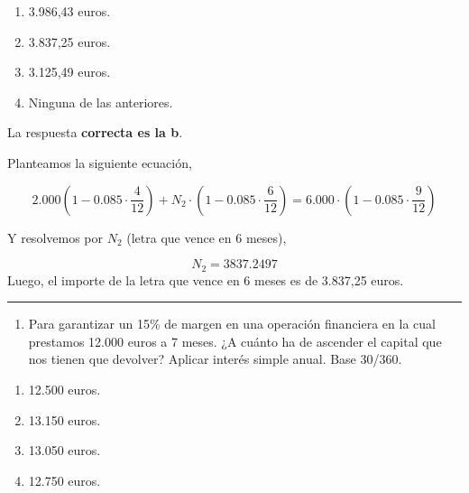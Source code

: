 \documentclass[
  letterpaper,
  DIV=11,
  numbers=noendperiod]{scrreprt}
\providecommand{\tightlist}{%
  \setlength{\itemsep}{0pt}\setlength{\parskip}{0pt}}\usepackage{longtable,booktabs,array}
\begin{document}
\begin{enumerate}
\def\labelenumi{\alph{enumi})}
\item
  3.986,43 euros.
\item
  3.837,25 euros.
\item
  3.125,49 euros.
\item
  Ninguna de las anteriores.
\end{enumerate}

\begin{tcolorbox}[enhanced jigsaw, left=2mm, opacityback=0, colback=white, breakable, arc=.35mm, bottomrule=.15mm, rightrule=.15mm, toprule=.15mm, leftrule=.75mm, colframe=quarto-callout-tip-color-frame]
\begin{minipage}[t]{5.5mm}
\textcolor{quarto-callout-tip-color}{\faLightbulb}
\end{minipage}%
\begin{minipage}[t]{\textwidth - 5.5mm}

La respuesta \textbf{correcta es la b}.

Planteamos la siguiente ecuación,

\[2.000\left(1-0.085\cdot\frac{4}{12}\right)+N _2\cdot\left(1-0.085\cdot\frac{6}{12}\right)=6.000\cdot\left(1-0.085\cdot\frac{9}{12}\right)\]

Y resolvemos por \(N _2\) (letra que vence en 6 meses),

\[N _2=3837.2497\] Luego, el importe de la letra que vence en 6 meses es
de 3.837,25 euros.

\end{minipage}%
\end{tcolorbox}

\begin{center}\rule{0.5\linewidth}{0.5pt}\end{center}

\begin{enumerate}
\def\labelenumi{\arabic{enumi}.}
\setcounter{enumi}{7}
\tightlist
\item
  Para garantizar un 15\% de margen en una operación financiera en la
  cual prestamos 12.000 euros a 7 meses. ¿A cuánto ha de ascender el
  capital que nos tienen que devolver? Aplicar interés simple anual.
  Base 30/360.
\end{enumerate}

\begin{enumerate}
\def\labelenumi{\alph{enumi})}
\item
  12.500 euros.
\item
  13.150 euros.
\item
  13.050 euros.
\item
  12.750 euros.
\end{enumerate}
\end{document}
